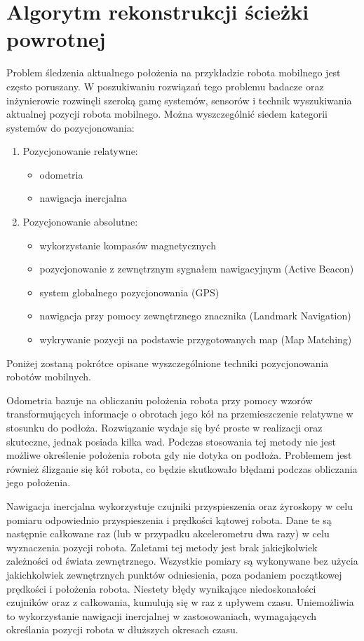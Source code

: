 \section{Algorytm rekonstrukcji ścieżki powrotnej}
\label{sec:rtrwca}
Problem śledzenia aktualnego położenia na przykładzie robota mobilnego jest często poruszany. W poszukiwaniu rozwiązań tego problemu badacze oraz inżynierowie rozwinęli szeroką gamę systemów, sensorów i technik wyszukiwania aktualnej pozycji robota mobilnego. Można wyszczególnić siedem kategorii systemów do pozycjonowania:
\begin{enumerate}
  \item Pozycjonowanie relatywne:
  \begin{itemize}
    \item odometria
    \item nawigacja inercjalna
  \end{itemize}
  \item Pozycjonowanie absolutne:
  \begin{itemize}
    \item wykorzystanie kompasów magnetycznych
    \item pozycjonowanie z zewnętrznym sygnałem nawigacyjnym (Active Beacon)
    \item system globalnego pozycjonowania (GPS)
    \item nawigacja przy pomocy zewnętrznego znacznika (Landmark Navigation)
    \item wykrywanie pozycji na podstawie przygotowanych map (Map Matching)
  \end{itemize}
\end{enumerate}
Poniżej zostaną pokrótce opisane wyszczególnione techniki pozycjonowania robotów mobilnych.

Odometria bazuje na obliczaniu położenia robota przy pomocy wzorów transformujących informacje o obrotach jego kół na przemieszczenie relatywne w stosunku do podłoża. Rozwiązanie wydaje się być proste w realizacji oraz skuteczne, jednak posiada kilka wad. Podczas stosowania tej metody nie jest możliwe określenie położenia robota gdy nie dotyka on podłoża. Problemem jest również ślizganie się kół robota, co będzie skutkowało błędami podczas obliczania jego położenia.

Nawigacja inercjalna wykorzystuje czujniki przyspieszenia oraz żyroskopy w celu pomiaru odpowiednio przyspieszenia i prędkości kątowej robota. Dane te są następnie całkowane raz (lub w przypadku akcelerometru dwa razy) w celu wyznaczenia pozycji robota. Zaletami tej metody jest brak jakiejkolwiek zależności od świata zewnętrznego. Wszystkie pomiary są wykonywane bez użycia jakichkolwiek zewnętrznych punktów odniesienia, poza podaniem początkowej prędkości i położenia robota. Niestety błędy wynikające niedoskonałości czujników oraz z całkowania, kumulują się w raz z upływem czasu. Uniemożliwia to wykorzystanie nawigacji inercjalnej w zastosowaniach, wymagających określania pozycji robota w dłuższych okresach czasu.

